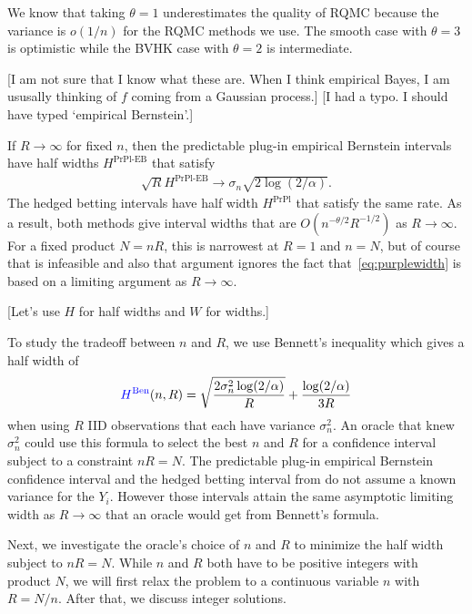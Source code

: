 \documentclass{article}
\newcommand{\art}[1]{\begingroup\color{blue}#1\endgroup}
\newcommand{\fred}[1]{\begingroup\color{red}#1\endgroup}
\newcommand{\prpl}{\text{PrPl}}
\newcommand{\prpleb}{\text{PrPl-EB}}
\newcommand{\ben}{\mathrm{Ben}}
\begin{document}
We know that taking $\theta=1$ underestimates
the quality of RQMC \art{because the variance
is $o(1/n)$ for the RQMC methods we use}. 
The smooth case with $\theta = 3$ is optimistic
while the BVHK case with $\theta=2$ is intermediate.

\fred{[I am not sure that I know what these are.  When I think empirical Bayes, I am ususally thinking of $f$ coming from a Gaussian process.]}
 \art{[I had a typo. I should have typed `empirical Bernstein'.]}

If $R\to\infty$ for fixed $n$, then the predictable
plug-in empirical Bernstein intervals 
\art{have half widths $H^\prpleb$ that satisfy}
\begin{align}\label{eq:purplewidth}
\sqrt{R}H^\prpleb\to \sigma_n\sqrt{2\log(2/\alpha)}.
\end{align}
\art{The hedged betting intervals have half width
$H^\prpl$ that satisfy the same rate.
As a result, both methods
give interval widths that are $O(n^{-\theta/2}R^{-1/2})$
as $R\to\infty$.}
For a fixed product $N=nR$, this is narrowest at $R=1$
and $n=N$, but of course that is infeasible and also
that argument ignores the fact that~\eqref{eq:purplewidth}
is based on a limiting argument as $R\to\infty$.

\art{[Let's use $H$ for half widths and $W$ for widths.]}

To study the tradeoff between $n$ and $R$, we use Bennett's 
inequality which gives a half width of
\begin{align}\label{eq:bennettwidth}
\art{H^\ben}(n,R)=\sqrt{\frac{2\sigma_n^2\log(2/\alpha)}R}
+ \frac{\log(2/\alpha)}{3R}
\end{align}
when using $R$ IID observations that each have variance
$\sigma^2_n$. An oracle that knew $\sigma^2_n$ could
use this formula to select the best $n$ and $R$
for a confidence interval subject to a constraint $nR=N$.
The predictable plug-in empirical Bernstein confidence interval
\art{and the hedged betting interval}
from \cite{WauRam24a} do not assume a known variance
for the $Y_i$.
However those intervals attain the same asymptotic limiting width
as $R\to\infty$ that an oracle would get from Bennett's formula. 

Next, we investigate the oracle's choice of $n$ and $R$
to minimize the half width subject to $nR=N$. 
While $n$ and $R$ both have to be positive integers
with product $N$, we will first relax the problem
to a continuous variable $n$ with $R=N/n$.  After that, we
discuss integer solutions.
\end{document}

